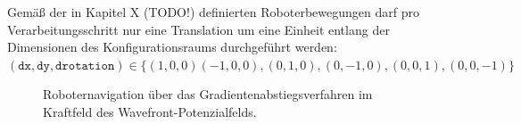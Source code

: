 Gemäß der in Kapitel X (TODO!) definierten Roboterbewegungen darf pro Verarbeitungsschritt nur eine Translation um eine Einheit entlang der Dimensionen des Konfigurationsraums  durchgeführt werden: $ (\texttt{dx}, \texttt{dy}, \texttt{drotation}) \in \{(1,0,0)(-1,0,0),(0,1,0),(0,-1,0),(0,0,1),(0,0,-1)\}$
\vspace*{0.1cm}
\begin{figure}[h!]
	\centering
	\footnotesize
	\centerline{}
	\caption{Roboternavigation über das Gradientenabstiegsverfahren im Kraftfeld des Wavefront-Potenzialfelds.}
\end{figure}




